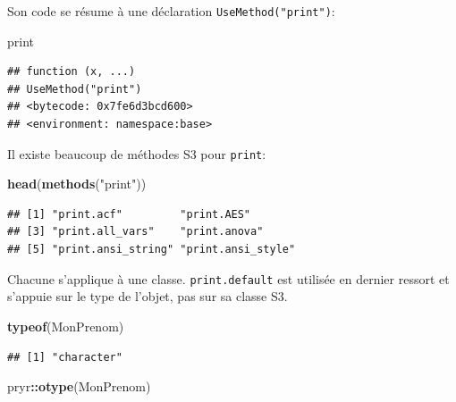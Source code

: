 \documentclass[
  12pt,
  french,
  a4paper,
  extrafontsizes,onecolumn,openright
  ]{memoir}
\newenvironment{Shaded}{\begin{snugshade}}{\end{snugshade}}
\newcommand{\KeywordTok}[1]{\textcolor[rgb]{0.13,0.29,0.53}{\textbf{#1}}}
\newcommand{\NormalTok}[1]{#1}
\newcommand{\OperatorTok}[1]{\textcolor[rgb]{0.81,0.36,0.00}{\textbf{#1}}}
\newcommand{\StringTok}[1]{\textcolor[rgb]{0.31,0.60,0.02}{#1}}
\begin{document}
\normalsize

Son code se résume à une déclaration \texttt{UseMethod("print")}:

\scriptsize

\begin{Shaded}
\begin{Highlighting}[]
\NormalTok{print}
\end{Highlighting}
\end{Shaded}

\begin{verbatim}
## function (x, ...) 
## UseMethod("print")
## <bytecode: 0x7fe6d3bcd600>
## <environment: namespace:base>
\end{verbatim}

\normalsize

Il existe beaucoup de méthodes S3 pour \texttt{print}:

\scriptsize

\begin{Shaded}
\begin{Highlighting}[]
\KeywordTok{head}\NormalTok{(}\KeywordTok{methods}\NormalTok{(}\StringTok{"print"}\NormalTok{))}
\end{Highlighting}
\end{Shaded}

\begin{verbatim}
## [1] "print.acf"         "print.AES"        
## [3] "print.all_vars"    "print.anova"      
## [5] "print.ansi_string" "print.ansi_style"
\end{verbatim}

\normalsize

Chacune s'applique à une classe. \texttt{print.default} est utilisée en dernier ressort et s'appuie sur le type de l'objet, pas sur sa classe S3.

\scriptsize

\begin{Shaded}
\begin{Highlighting}[]
\KeywordTok{typeof}\NormalTok{(MonPrenom)}
\end{Highlighting}
\end{Shaded}

\begin{verbatim}
## [1] "character"
\end{verbatim}

\begin{Shaded}
\begin{Highlighting}[]
\NormalTok{pryr}\OperatorTok{::}\KeywordTok{otype}\NormalTok{(MonPrenom)}
\end{Highlighting}
\end{Shaded}
\end{document}
